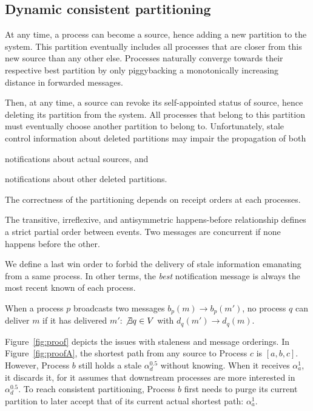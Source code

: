 

\subsection{Dynamic consistent partitioning}
At any time, a process can become a source, hence adding a new
partition to the system. This partition eventually includes all
processes that are closer from this new source than any other
else. Processes naturally converge towards their respective best
partition by only piggybacking a monotonically increasing distance in
forwarded messages.

Then, at any time, a source can revoke its self-appointed status of
source, hence deleting its partition from the system. All processes
that belong to this partition must eventually choose another partition
to belong to. Unfortunately, stale control information about deleted
partitions may impair the propagation of both
\begin{inparaenum}[(i)]
\item notifications about actual sources, and
\item notifications about other deleted partitions.
\end{inparaenum}
The correctness of the partitioning depends on receipt orders at each
processes.

\begin{definition}
  The transitive, irreflexive, and antisymmetric happens-before
  relationship defines a strict partial order between events. Two
  messages are concurrent if none happens before the other.
\end{definition}

We define a last win order to forbid the delivery of stale information
emanating from a same process. In other terms, the \emph{best}
notification message is always the most recent known of each process.
 
\begin{definition}
  When a process $p$ broadcasts two messages $b_p(m) \rightarrow
  b_p(m')$, no process $q$ can deliver $m$ if it has delivered $m'$:
  $\not\exists q \in V$ with $d_q(m') \rightarrow d_q(m)$.
\end{definition}

Figure~\ref{fig:proof} depicts the issues with staleness and message
orderings. In Figure~\ref{fig:proofA}, the shortest path from any
source to Process $c$ is $[a, b, c]$. However, Process $b$ still holds
a stale $\alpha_d^{0.5}$ without knowing. When it receives
$\alpha_a^1$, it discards it, for it assumes that downstream processes
are more interested in $\alpha_d^{0.5}$. To reach consistent
partitioning, Process $b$ first needs to purge its current partition
to later accept that of its current actual shortest path:
$\alpha_a^1$.

